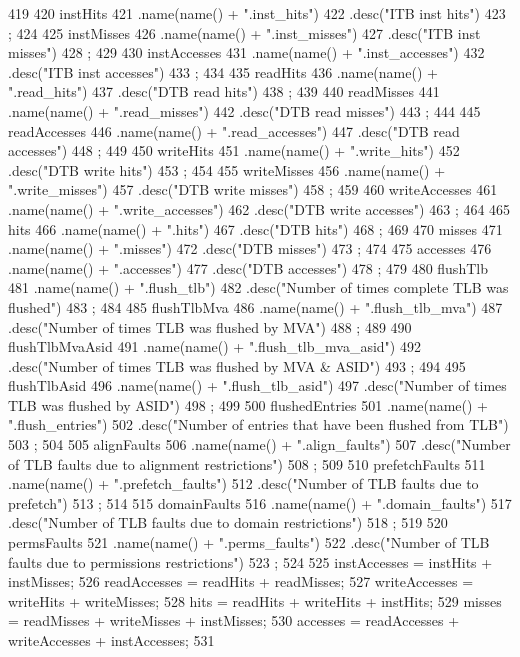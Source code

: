 \begin{DoxyCode}
419 {
420     instHits
421         .name(name() + ".inst_hits")
422         .desc("ITB inst hits")
423         ;
424 
425     instMisses
426         .name(name() + ".inst_misses")
427         .desc("ITB inst misses")
428         ;
429 
430     instAccesses
431         .name(name() + ".inst_accesses")
432         .desc("ITB inst accesses")
433         ;
434 
435     readHits
436         .name(name() + ".read_hits")
437         .desc("DTB read hits")
438         ;
439 
440     readMisses
441         .name(name() + ".read_misses")
442         .desc("DTB read misses")
443         ;
444 
445     readAccesses
446         .name(name() + ".read_accesses")
447         .desc("DTB read accesses")
448         ;
449 
450     writeHits
451         .name(name() + ".write_hits")
452         .desc("DTB write hits")
453         ;
454 
455     writeMisses
456         .name(name() + ".write_misses")
457         .desc("DTB write misses")
458         ;
459 
460     writeAccesses
461         .name(name() + ".write_accesses")
462         .desc("DTB write accesses")
463         ;
464 
465     hits
466         .name(name() + ".hits")
467         .desc("DTB hits")
468         ;
469 
470     misses
471         .name(name() + ".misses")
472         .desc("DTB misses")
473         ;
474 
475     accesses
476         .name(name() + ".accesses")
477         .desc("DTB accesses")
478         ;
479 
480     flushTlb
481         .name(name() + ".flush_tlb")
482         .desc("Number of times complete TLB was flushed")
483         ;
484 
485     flushTlbMva
486         .name(name() + ".flush_tlb_mva")
487         .desc("Number of times TLB was flushed by MVA")
488         ;
489 
490     flushTlbMvaAsid
491         .name(name() + ".flush_tlb_mva_asid")
492         .desc("Number of times TLB was flushed by MVA & ASID")
493         ;
494 
495     flushTlbAsid
496         .name(name() + ".flush_tlb_asid")
497         .desc("Number of times TLB was flushed by ASID")
498         ;
499 
500     flushedEntries
501         .name(name() + ".flush_entries")
502         .desc("Number of entries that have been flushed from TLB")
503         ;
504 
505     alignFaults
506         .name(name() + ".align_faults")
507         .desc("Number of TLB faults due to alignment restrictions")
508         ;
509 
510     prefetchFaults
511         .name(name() + ".prefetch_faults")
512         .desc("Number of TLB faults due to prefetch")
513         ;
514 
515     domainFaults
516         .name(name() + ".domain_faults")
517         .desc("Number of TLB faults due to domain restrictions")
518         ;
519 
520     permsFaults
521         .name(name() + ".perms_faults")
522         .desc("Number of TLB faults due to permissions restrictions")
523         ;
524 
525     instAccesses = instHits + instMisses;
526     readAccesses = readHits + readMisses;
527     writeAccesses = writeHits + writeMisses;
528     hits = readHits + writeHits + instHits;
529     misses = readMisses + writeMisses + instMisses;
530     accesses = readAccesses + writeAccesses + instAccesses;
531 }
\end{DoxyCode}
